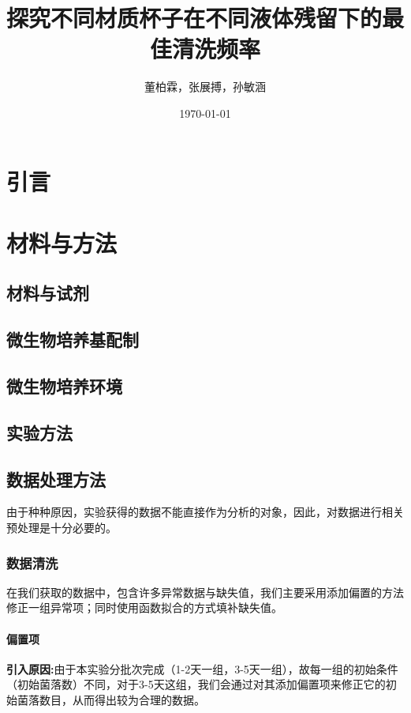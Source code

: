 \documentclass[12pt,a4paper]{ctexart}
\title{探究不同材质杯子在不同液体残留下的最佳清洗频率}
\author{董柏霖，张展搏，孙敏涵}
\date{\today}  %
\begin{document}
\maketitle  %

\begin{abstract}

\end{abstract}
\newpage
\tableofcontents
\newpage

\section{引言}

\section{材料与方法}
\subsection{材料与试剂}

\subsection{微生物培养基配制}

\subsection{微生物培养环境}

\subsection{实验方法}
\subsection{数据处理方法}
由于种种原因，实验获得的数据不能直接作为分析的对象，因此，对数据进行相关预处理是十分必要的。
\subsubsection{数据清洗}
在我们获取的数据中，包含许多异常数据与缺失值，我们主要采用添加偏置的方法修正一组异常项；同时使用函数拟合的方式填补缺失值。
\paragraph{偏置项}
\textbf{引入原因:}由于本实验分批次完成（1-2天一组，3-5天一组），故每一组的初始条件（初始菌落数）不同，对于3-5天这组，我们会通过对其添加偏置项来修正它的初始菌落数目，从而得出较为合理的数据。
\end{document}
